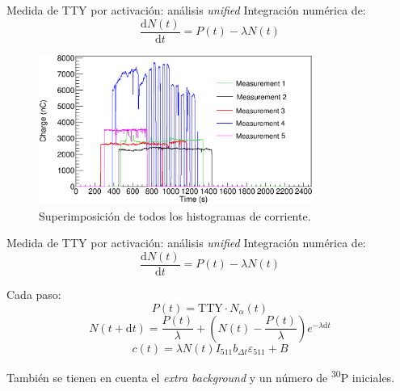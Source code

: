 \documentclass[11pt]{beamer}
\newcommand{\dif}{\text{d}}
\newcommand{\ddt}[1]{\frac{\dif #1}{\dif t}}
\newcommand{\Piso}{\textsuperscript{30}P }
\begin{document}
\begin{frame}{Medida de TTY por activación: análisis \textit{unified}}
	Integración numérica de:
	\[\ddt{N(t)} = P(t) -\lambda N(t)\]

	\begin{figure}[H]
		\centering
		\includegraphics[width=0.80\textwidth]{current_histograms.eps}
		\caption{Superimposición de todos los histogramas de corriente.}
		\label{}
	\end{figure}
\end{frame}

\begin{frame}{Medida de TTY por activación: análisis \textit{unified}}
	Integración numérica de:
	\[\ddt{N(t)} = P(t) -\lambda N(t)\]

	Cada paso:
	\begin{equation}
		P(t) = \text{TTY}\cdot N_\alpha(t)
	\end{equation}
	\begin{equation}
		N(t+\dif t)=\frac{P(t)}{\lambda} + \left( N(t)-\frac{P(t)}{\lambda} \right) e^{-\lambda \dif t}
	\end{equation}
	\begin{equation}
		c(t) = \lambda N(t) I_{511}b_{\Delta t}\varepsilon_{511} + B
	\end{equation}

	También se tienen en cuenta el \textit{extra background} y un número de \Piso iniciales.
\end{frame}
\end{document}
